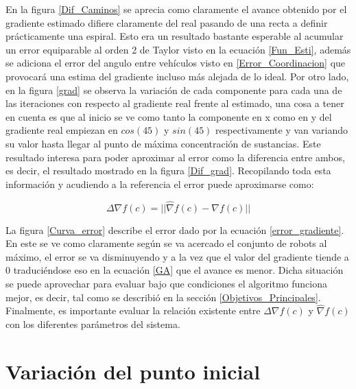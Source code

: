 En la figura \ref{Dif_Caminos} se aprecia como claramente el avance obtenido por el gradiente estimado difiere claramente del real pasando de una recta a definir prácticamente una espiral. Esto era un resultado bastante esperable al acumular un error equiparable al orden 2 de Taylor visto en la ecuación \ref{Fun_Esti}, además se adiciona el error del angulo entre vehículos visto en \ref{Error_Coordinacion} que provocará una estima del gradiente incluso más alejada de lo ideal. Por otro lado, en la figura \ref{grad} se observa la variación de cada componente para cada una de las iteraciones con respecto al gradiente real frente al estimado, una cosa a tener en cuenta es que al inicio se ve como tanto la componente en x como en y del gradiente real empiezan en $cos(45)$ y $sin(45)$ respectivamente y van variando su valor hasta llegar al punto de máxima concentración de sustancias. Este resultado interesa para poder aproximar al error como la diferencia entre ambos, es decir, el resultado mostrado en la figura \ref{Dif_grad}.
\newpage
Recopilando toda esta información y acudiendo a la referencia \cite{Estimacion_Gradiente} el error puede aproximarse como:

\begin{equation} \label{error_gradiente}
	\Delta{\nabla{f\left(c\right)}}=||\hat{\nabla}f\left(c\right)-\nabla{f}\left(c\right)||
\end{equation}

La figura \ref{Curva_error} describe el error dado por la ecuación \ref{error_gradiente}. En este se ve como claramente según se va acercado el conjunto de robots al máximo, el error se va disminuyendo y a la vez que el valor del gradiente tiende a 0 traduciéndose eso en la ecuación \ref{GA} que el avance es menor. Dicha situación se puede aprovechar para evaluar bajo que condiciones el algoritmo funciona mejor, es decir, tal como se describió en la sección \ref{Objetivos_Principales}. Finalmente, es importante evaluar la relación existente entre $\Delta{\nabla{f\left(c\right)}}$ y $\hat{\nabla}{f\left(c\right)}$ con los diferentes parámetros del sistema.

\section{Variación del punto inicial}

